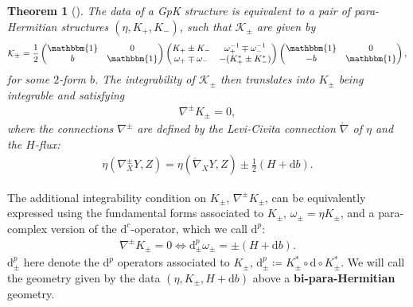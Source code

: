 \documentclass{article}
\newcommand{\KK}{\mathcal{K}}
\newcommand{\id}{\mathbbm{1}}
\newcommand{\lc}{\mathring{\n}}
\newcommand{\n}{\nabla}
\newcommand{\rd}{\mathrm{d}}
\newtheorem{theorem}{Theorem}[section]
\theoremstyle{definition}
\theoremstyle{definition}
\theoremstyle{remark}
\begin{document}
\begin{theorem}[\cite{inprogress}]
The data of a GpK structure is equivalent to a pair of para-Hermitian structures $(\eta,K_+,K_-)$, such that $\KK_\pm$ are given by
\begin{align}\label{eq:GpK_genform}
\KK_{\pm}=\frac{1}{2}
\begin{pmatrix}
\id & 0 \\
b & \id
\end{pmatrix}
\begin{pmatrix}
K_+\pm K_- & \omega^{-1}_+\mp \omega^{-1}_- \\
\omega_+\mp \omega_- & -(K_+^*\pm K_-^*)
\end{pmatrix}
\begin{pmatrix}
\id & 0 \\
-b & \id
\end{pmatrix},
\end{align}
for some $2$-form $b$. The integrability of $\KK_\pm$ then translates into $K_\pm$ being integrable and satisfying
\begin{align*}
\n^\pm K_\pm=0,
\end{align*}
where the connections $\n^\pm$ are defined by the Levi-Civita connection $\lc$ of $\eta$ and the $H$-flux:
\begin{align*}
\eta(\n^\pm_XY,Z)=\eta(\lc_XY,Z)\pm\frac{1}{2}(H+\rd b).
\end{align*}
\end{theorem}

The additional integrability condition on $K_\pm$, $\n^\pm K_\pm$, can be equivalently expressed using the fundamental forms associated to $K_\pm$, $\omega_\pm=\eta K_\pm$, and a para-complex version of the $\rd^c$-operator, which we call $\rd^p$:
\begin{align*}
\n^\pm K_\pm=0 \Longleftrightarrow \rd^p_\pm\omega_\pm=\pm (H+\rd b).
\end{align*}
$\rd^p_\pm$ here denote the $\rd^p$ operators associated to $K_\pm$, $\rd^p_\pm\coloneqq K_\pm^*\circ \rd\circ K_\pm^*$. We will call the geometry given by the data $(\eta, K_\pm, H+\rd b)$ above a {\bf bi-para-Hermitian} geometry.
\end{document}
